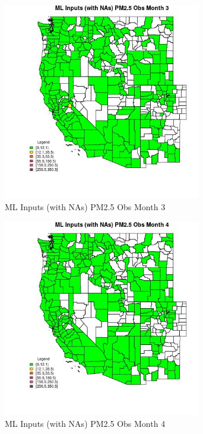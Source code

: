 \begin{figure} 
\centering  
\includegraphics[width=0.77\textwidth]{Code_Outputs/Report_ML_input_PM25_Step4_part_e_de_duplicated_aves_compiled_2019-05-20wNAs_CountyPM25_ObsmedianMonth3.jpg} 
\caption{\label{fig:Report_ML_input_PM25_Step4_part_e_de_duplicated_aves_compiled_2019-05-20wNAsCountyPM25_ObsmedianMonth3}ML Inputs (with NAs) PM2.5 Obs Month 3} 
\end{figure} 
 

\begin{figure} 
\centering  
\includegraphics[width=0.77\textwidth]{Code_Outputs/Report_ML_input_PM25_Step4_part_e_de_duplicated_aves_compiled_2019-05-20wNAs_CountyPM25_ObsmedianMonth4.jpg} 
\caption{\label{fig:Report_ML_input_PM25_Step4_part_e_de_duplicated_aves_compiled_2019-05-20wNAsCountyPM25_ObsmedianMonth4}ML Inputs (with NAs) PM2.5 Obs Month 4} 
\end{figure} 
 

